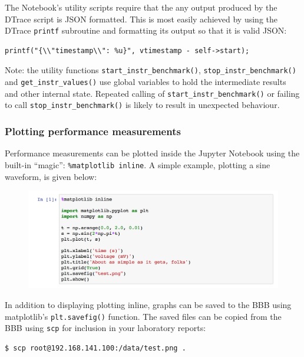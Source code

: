 \documentclass[a4paper,10pt]{article}
\begin{document}
{The Notebook's utility scripts require that the any output produced by the
DTrace script is JSON formatted.  This is most easily achieved by using the
DTrace \texttt{printf} subroutine and formatting its output so that it is valid
JSON:

\begin{verbatim}
printf("{\\"timestamp\\": %u}", vtimestamp - self->start);
\end{verbatim}

Note: the utility functions \texttt{start\_instr\_benchmark()},
\texttt{stop\_instr\_benchmark()} and \newline
\texttt{get\_instr\_values()} use global
variables to hold the intermediate results and other internal state. Repeated
calling of \newline
\texttt{start\_instr\_benchmark()} or failing to call
\texttt{stop\_instr\_benchmark()} is likely to result in unexpected behaviour.

\subsubsection*{Plotting performance measurements}

Performance measurements can be plotted inside  the Jupyter Notebook using the
built-in ``magic'': \texttt{\%matplotlib inline}.  A simple example, plotting a
sine waveform, is given below:

\begin{figure}[H]
\includegraphics[width=\linewidth]{jupyter_matplotlib.png}
\end{figure}

In addition to displaying plotting inline, graphs can be saved to the BBB
using matplotlib's \texttt{plt.savefig()} function.  The saved files can 
be copied from the BBB using \texttt{scp} for inclusion in your laboratory
reports:

\begin{verbatim}
$ scp root@192.168.141.100:/data/test.png .
\end{verbatim}

}
\end{document}
